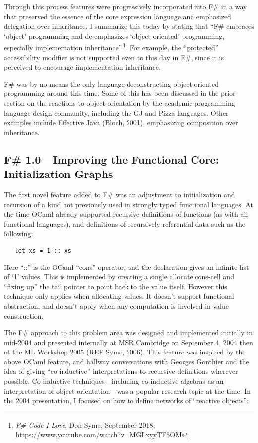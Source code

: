 \documentclass[acmsmall]{acmart}\settopmatter{}
\begin{document}
Through this process features were progressively incorporated into F\# in a way that preserved the essence of the core expression language and emphasized delegation over inheritance.  I summarize this today by stating that “F\# embraces ‘object’ programming and de-emphasizes ‘object-oriented’ programming, especially implementation inheritance”.\footnote{\textit{F\# Code I Love}, Don Syme, September 2018, \url{https://www.youtube.com/watch?v=MGLxyyTF3OM}}.  For example, the “protected” accessibility modifier is not supported even to this day in F\#, since it is perceived to encourage implementation inheritance.

F\# was by no means the only language deconstructing object-oriented programming around this time. Some of this has been discussed in the prior section on the reactions to object-orientation by the academic programming language design community, including the GJ and Pizza languages. Other examples include Effective Java (Bloch, 2001), emphasizing composition over inheritance.


\subsection*{F\# 1.0---Improving the Functional Core: Initialization Graphs}

The first novel feature added to F\# was an adjustment to initialization and recursion of a kind not previously used in strongly typed functional languages. At the time OCaml already supported recursive definitions of functions (as with all functional languages), and definitions of recursively-referential data such as the following:
\begin{verbatim}
   let xs = 1 :: xs
\end{verbatim}

Here “::” is the OCaml “cons” operator, and the declaration gives an infinite list of ‘1’ values. This is implemented by creating a single allocate cons-cell and “fixing up” the tail pointer to point back to the value itself.  However this technique only applies when allocating values.  It doesn’t support functional abstraction, and doesn’t apply when any computation is involved in value construction.

The F\# approach to this problem area was designed and implemented initially in mid-2004 and presented internally at MSR Cambridge on September 4, 2004 then at the ML Workshop 2005 (REF Syme, 2006). This feature was inspired by the above OCaml feature, and hallway conversations with Georges Gonthier and the idea of giving “co-inductive” interpretations to recursive definitions wherever possible.  Co-inductive techniques---including co-inductive algebras as an interpretation of object-orientation---was a popular research topic at the time. In the 2004 presentation, I focused on how to define networks of “reactive objects”: 
\end{document}
